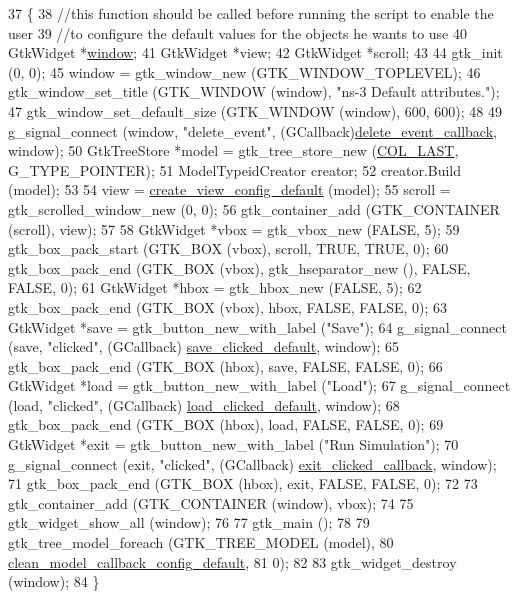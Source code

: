 \begin{DoxyCode}
37 \{
38   \textcolor{comment}{//this function should be called before running the script to enable the user}
39   \textcolor{comment}{//to configure the default values for the objects he wants to use}
40   GtkWidget *\hyperlink{namespacevisualizer_1_1ipython__view_ae2c349e0d13465bcd100c8bad952117f}{window};
41   GtkWidget *view;
42   GtkWidget *scroll;
43 
44   gtk\_init (0, 0);
45   window = gtk\_window\_new (GTK\_WINDOW\_TOPLEVEL);
46   gtk\_window\_set\_title (GTK\_WINDOW (window), \textcolor{stringliteral}{"ns-3 Default attributes."});
47   gtk\_window\_set\_default\_size (GTK\_WINDOW (window), 600, 600);
48 
49   g\_signal\_connect (window, \textcolor{stringliteral}{"delete\_event"}, (GCallback)\hyperlink{namespacens3_a6b4c03fb0d3d8513e740dd12b7033c2b}{delete\_event\_callback}, window);
50   GtkTreeStore *model = gtk\_tree\_store\_new (\hyperlink{namespacens3_a6e83be9a9c7a487ef6583e1c7b5db333a7d7fad15f1c717d9de73f71dca0f4966}{COL\_LAST}, G\_TYPE\_POINTER);
51   ModelTypeidCreator creator;
52   creator.Build (model);
53 
54   view = \hyperlink{namespacens3_a9b0de38431169a0ec08415d6f1a2fa67}{create\_view\_config\_default} (model);
55   scroll = gtk\_scrolled\_window\_new (0, 0);
56   gtk\_container\_add (GTK\_CONTAINER (scroll), view);
57 
58   GtkWidget *vbox = gtk\_vbox\_new (FALSE, 5);
59   gtk\_box\_pack\_start (GTK\_BOX (vbox), scroll, TRUE, TRUE, 0);
60   gtk\_box\_pack\_end (GTK\_BOX (vbox), gtk\_hseparator\_new (), FALSE, FALSE, 0);
61   GtkWidget *hbox = gtk\_hbox\_new (FALSE, 5);
62   gtk\_box\_pack\_end (GTK\_BOX (vbox), hbox, FALSE, FALSE, 0);
63   GtkWidget *save = gtk\_button\_new\_with\_label (\textcolor{stringliteral}{"Save"});
64   g\_signal\_connect (save, \textcolor{stringliteral}{"clicked"},  (GCallback) \hyperlink{namespacens3_ae70b84ab7090f1eaa73e7209be9400d2}{save\_clicked\_default}, window);
65   gtk\_box\_pack\_end (GTK\_BOX (hbox), save, FALSE, FALSE, 0);
66   GtkWidget *load = gtk\_button\_new\_with\_label (\textcolor{stringliteral}{"Load"});
67   g\_signal\_connect (load, \textcolor{stringliteral}{"clicked"},  (GCallback) \hyperlink{namespacens3_af500ab6459ed7099c0e403a504f9339e}{load\_clicked\_default}, window);
68   gtk\_box\_pack\_end (GTK\_BOX (hbox), load, FALSE, FALSE, 0);
69   GtkWidget *exit = gtk\_button\_new\_with\_label (\textcolor{stringliteral}{"Run Simulation"});
70   g\_signal\_connect (exit, \textcolor{stringliteral}{"clicked"},  (GCallback) \hyperlink{namespacens3_a7f3b1dcf03a7f3a2f0d97a6ccf87fa62}{exit\_clicked\_callback}, window);
71   gtk\_box\_pack\_end (GTK\_BOX (hbox), exit, FALSE, FALSE, 0);
72 
73   gtk\_container\_add (GTK\_CONTAINER (window), vbox);
74 
75   gtk\_widget\_show\_all (window);
76 
77   gtk\_main ();
78 
79   gtk\_tree\_model\_foreach (GTK\_TREE\_MODEL (model), 
80                           \hyperlink{namespacens3_a9c65740963efd473d9039ae16aa3a408}{clean\_model\_callback\_config\_default},
81                           0);
82 
83   gtk\_widget\_destroy (window); 
84 \}
\end{DoxyCode}


